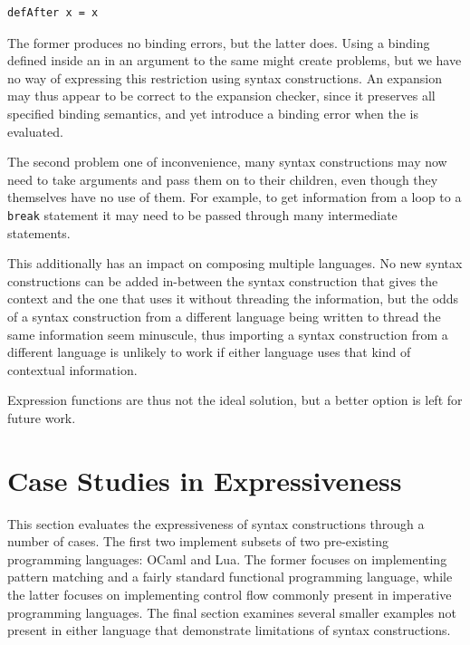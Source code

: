 \documentclass{kththesis}
\begin{document}
\begin{verbatim}
defAfter x = x
\end{verbatim}

The former produces no binding errors, but the latter does. Using a binding defined inside an  in an argument to the same  might create problems, but we have no way of expressing this restriction using syntax constructions. An expansion may thus appear to be correct to the expansion checker, since it preserves all specified binding semantics, and yet introduce a binding error when the  is evaluated.

The second problem one of inconvenience, many syntax constructions may now need to take arguments and pass them on to their children, even though they themselves have no use of them. For example, to get information from a loop to a \texttt{break} statement it may need to be passed through many intermediate statements.

This additionally has an impact on composing multiple languages. No new syntax constructions can be added in-between the syntax construction that gives the context and the one that uses it without threading the information, but the odds of a syntax construction from a different language being written to thread the same information seem minuscule, thus importing a syntax construction from a different language is unlikely to work if either language uses that kind of contextual information.

Expression functions are thus not the ideal solution, but a better option is left for future work.

\section{Case Studies in Expressiveness} \label{sec:case-studies}

This section evaluates the expressiveness of syntax constructions through a number of cases. The first two implement subsets of two pre-existing programming languages: OCaml and Lua. The former focuses on implementing pattern matching and a fairly standard functional programming language, while the latter focuses on implementing control flow commonly present in imperative programming languages. The final section examines several smaller examples not present in either language that demonstrate limitations of syntax constructions.

\end{document}
